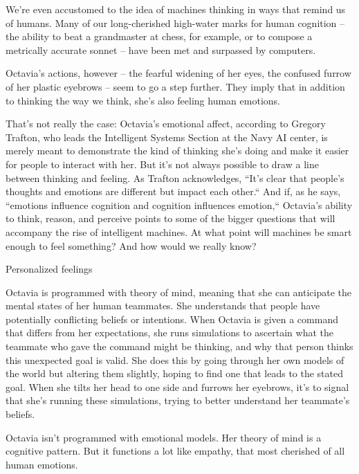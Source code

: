 \documentclass[9pt,a4paper]{extarticle}
\makeatletter
\newlength{\newsleading}
\renewcommand{\subsection}[1]{%
  \par\addpenalty{\@secpenalty}\addvspace{\newsleading}%
  \begingroup
    \sffamily\bfseries\fontsize{8}{\newsleading}\selectfont
    \interlinepenalty=10000
    \noindent\strut #1\strut\par
  \endgroup
  \nobreak\@afterindentfalse\@afterheading
}
\makeatother
\begin{document}
We’re even accustomed to the idea of machines thinking in ways that remind us of humans. Many of our long-cherished high-water marks for human cognition – the ability to beat a grandmaster at chess, for example, or to compose a metrically accurate sonnet – have been met and surpassed by computers.

Octavia’s actions, however – the fearful widening of her eyes, the confused furrow of her plastic eyebrows – seem to go a step further. They imply that in addition to thinking the way we think, she’s also feeling human emotions.

That’s not really the case: Octavia’s emotional affect, according to Gregory Trafton, who leads the Intelligent Systems Section at the Navy AI center, is merely meant to demonstrate the kind of thinking she’s doing and make it easier for people to interact with her. But it’s not always possible to draw a line between thinking and feeling. As Trafton acknowledges, “It’s clear that people’s thoughts and emotions are different but impact each other.“ And if, as he says, “emotions influence cognition and cognition influences emotion,“ Octavia’s ability to think, reason, and perceive points to some of the bigger questions that will accompany the rise of intelligent machines. At what point will machines be smart enough to feel something? And how would we really know?

\subsection{Personalized feelings}

Octavia is programmed with theory of mind, meaning that she can anti­cipate the mental states of her human teammates. She understands that people have potentially conflicting beliefs or intentions. When Octavia is given a command that differs from her expectations, she runs simulations to ascertain what the teammate who gave the command might be thinking, and why that person thinks this unexpected goal is valid. She does this by going through her own models of the world but altering them slightly, hoping to find one that leads to the stated goal. When she tilts her head to one side and furrows her eyebrows, it’s to signal that she’s running these simulations, trying to better understand her teammate’s beliefs.

Octavia isn’t programmed with emotional models. Her theory of mind is a cognitive pattern. But it functions a lot like empathy, that most cherished of all human emotions.
\end{document}

